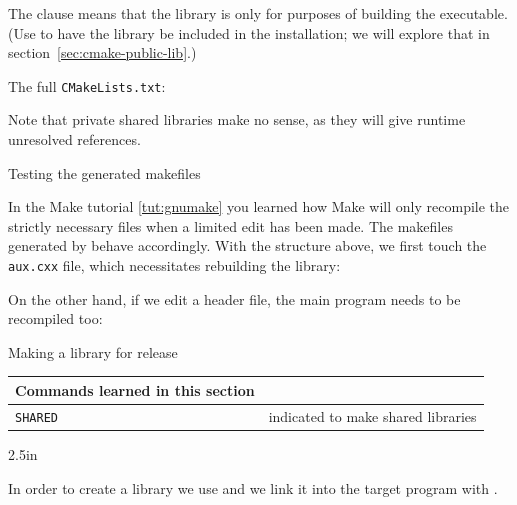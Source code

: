 The  clause means that the library is only for
purposes of building the executable.
(Use  to have the library be included in the installation;
we will explore that in section~\ref{sec:cmake-public-lib}.)

The full \lstinline[language=shell]{CMakeLists.txt}:
%


Note that private shared libraries make no sense, as they will give
runtime unresolved references.

 {Testing the generated makefiles}

  In the Make tutorial \ref{tut:gnumake} you learned how Make
will only recompile
the strictly necessary files when a limited edit has been made.
The makefiles generated by  behave accordingly.
With the structure above, we first touch the \lstinline[language=shell]{aux.cxx} file,
which necessitates rebuilding the library:
%


On the other hand, if we edit a header file, the main program
needs to be recompiled too:
%


\newpage
{} {Making a library for release}
\label{sec:cmake-public-lib}


\begin{tabular}{lp{3in}}
  \toprule
  Commands learned in this section\\
  \midrule
  \lstinline+SHARED+&indicated to make shared libraries\\
  \bottomrule
\end{tabular}

\begin{floatingfigure}[r]{2.5in}
  \begin{minipage}{2.5in}
  \end{minipage}
\end{floatingfigure}
%
In order to create a library we use 
and we link it into the target program with .

